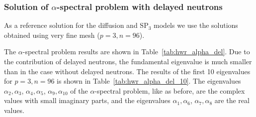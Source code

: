 \documentclass[a4paper]{jpconf}
\begin{document}

\subsubsection{Solution of $\alpha$-spectral problem with delayed neutrons}

As a reference solution for the diffusion and $\mathrm{SP_3}$ models we use the solutions obtained using very fine mesh ($p = 3, n = 96$).

The $\alpha$-spectral problem results are shown in Table~\ref{tab:hwr_alpha_del}. 
Due to the contribution of delayed neutrons, the fundamental eigenvalue is much smaller than in the case without delayed neutrons.
The results of the first 10 eigenvalues for $p = 3, n = 96 $ is shown in Table~\ref{tab:hwr_alpha_del_10}.
The eigenvalues $\alpha_2, \alpha_3$, $\alpha_4, \alpha_5$, $\alpha_9, \alpha_{10}$ of the $\alpha$-spectral problem, like as before, are the complex values with small imaginary parts, and the eigenvalues $\alpha_1, \alpha_6$, $\alpha_7, \alpha_8$ are the real values.
\end{document}
